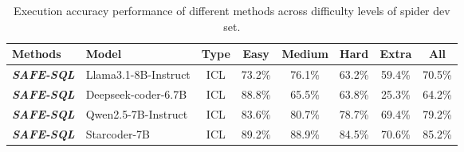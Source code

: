 \begin{table*}[t]
\centering
\begin{tabular}{llcccccc}
\toprule
\textbf{Methods}& \textbf{Model}& \textbf{Type}  & \textbf{Easy} & \textbf{Medium} & \textbf{Hard} & \textbf{Extra} & \textbf{All} \\  
\midrule 
\textit{\textbf{ \textit{SAFE-SQL}}}& Llama3.1-8B-Instruct& ICL & {73.2\%} & {76.1}\% & {63.2\%} & {59.4\%} & {70.5\%} 

\\
\textit{\textbf{ \textit{SAFE-SQL}}}& Deepseek-coder-6.7B & ICL & {88.8\%} & {65.5}\% & {63.8\%} & {25.3\%} & {64.2\%} 

\\
\textit{\textbf{ \textit{SAFE-SQL}}}& Qwen2.5-7B-Instruct & ICL & {83.6\%} & {80.7}\% & {78.7\%} & {69.4\%} & {79.2\%} 

\\ 
\textit{\textbf{ \textit{SAFE-SQL}}}& Starcoder-7B& ICL & {89.2\%} & {88.9}\% & {84.5\%} & {70.6\%} & {85.2\%} 
\\
\bottomrule

\end{tabular}
\caption{Execution accuracy performance of different methods across difficulty levels of spider dev set.}
\label{tab:another_main}
\end{table*}